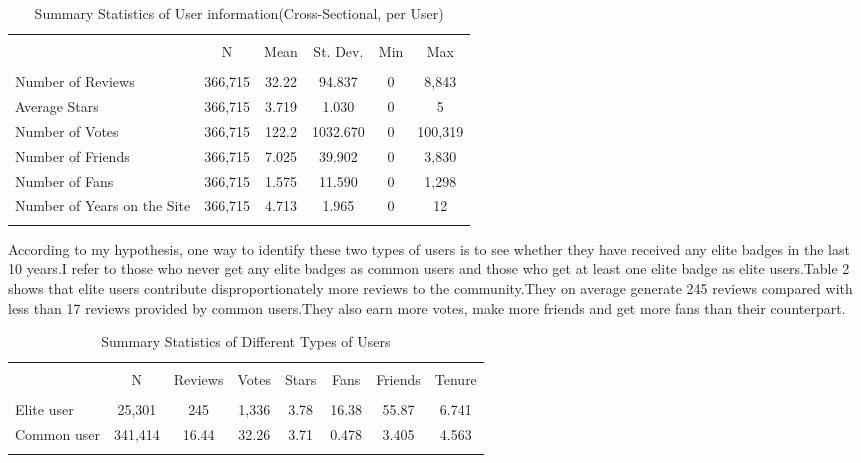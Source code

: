 \documentclass[12pt]{article}%
\begin{document}
\begin{table}[htbp] \centering 
\label{table1}
	\renewcommand\thetable{1}
  \caption{Summary Statistics of User information(Cross-Sectional, per User)  \label{PrePoIr} } 
\begin{tabular}{@{\extracolsep{5pt}}lccccc} 
\\[-1.8ex]\hline 
\hline \\[-1.8ex] 
  & \multicolumn{1}{c}{N} & \multicolumn{1}{c}{Mean} & \multicolumn{1}{c}{St. Dev.} & \multicolumn{1}{c}{Min} & \multicolumn{1}{c}{Max} \\ 
\hline \\[-1.8ex] 
Number of Reviews & 366,715 & 32.22 & 94.837 & 0 & 8,843 \\ 
Average Stars & 366,715 & 3.719 & 1.030 & 0 & 5 \\ 
Number of Votes & 366,715 & 122.2 & 1032.670 & 0 & 100,319 \\ 
Number of Friends & 366,715 & 7.025 & 39.902 & 0 & 3,830 \\ 
Number of Fans & 366,715 & 1.575 & 11.590 & 0 & 1,298 \\ 
Number of Years on the Site & 366,715 & 4.713 & 1.965 & 0 & 12 \\ 
\hline \\[-1.8ex] 
\end{tabular} 

\end{table}

According to my hypothesis, one way to identify these two types of users is to see whether they have received any elite badges in the last 10 years.I refer to those who never get any elite badges as common users and those who get at least one elite badge as elite users.Table 2 shows that elite users contribute disproportionately more reviews to the community.They on average generate 245 reviews compared with less than 17 reviews provided by common users.They also earn more votes, make more friends and get more fans than their counterpart.

\begin{table}[htbp] \centering 
	\renewcommand\thetable{2}
  \caption{Summary Statistics of Different Types of Users  \label{PrePoIr} } 
\begin{tabular}{@{\extracolsep{5pt}}lccccccc} 
\\[-1.8ex]\hline 
\hline \\[-1.8ex] 
  & \multicolumn{1}{c}{N} & \multicolumn{1}{c}{Reviews} & \multicolumn{1}{c}{Votes} & \multicolumn{1}{c}{Stars} & \multicolumn{1}{c}{Fans} & \multicolumn{1}{c}{Friends} & \multicolumn{1}{c}{Tenure} \\
\hline \\[-1.8ex] 
Elite user & 25,301 & 245 & 1,336 & 3.78 & 16.38 & 55.87 & 6.741 \\ 
Common user & 341,414 & 16.44 & 32.26 & 3.71 & 0.478 & 3.405 & 4.563 \\ 
\hline \\[-1.8ex] 
\end{tabular}

\end{table}
\end{document}

